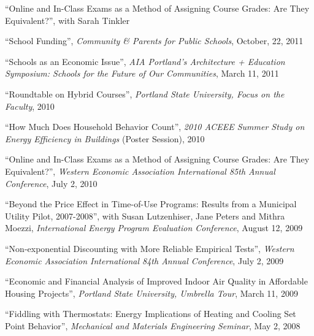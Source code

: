 \documentclass[Computer Science]{vita}
\begin{document}
\begin{vita}
\begin{Publications}
\begin{Work in progress}
\item ``Online and In-Class Exams as a Method of Assigning Course Grades: Are They Equivalent?'', with Sarah Tinkler



    \end{Work in progress}

  \end{Publications}

  \begin{Presentations and Invited Talks}
  \item ``School Funding'', \emph{Community \& Parents for Public Schools}, October, 22, 2011
  
\item ``Schools as an Economic Issue'', \emph{AIA Portland's Architecture + Education Symposium: Schools for the Future of Our Communities}, March 11, 2011

\item ``Roundtable on Hybrid Courses'', \emph{Portland State University, Focus on the Faculty}, 2010

  \item ``How Much Does Household Behavior Count'', \emph{2010 ACEEE
      Summer Study on Energy Efficiency in Buildings} (Poster
    Session), 2010
	  
  \item ``Online and In-Class Exams as a Method of Assigning Course
    Grades: Are They Equivalent?'', \emph{Western Economic Association
      International 85th Annual Conference}, July 2, 2010

  \item ``Beyond the Price Effect in Time-of-Use Programs: Results
    from a Municipal Utility Pilot, 2007-2008'', with Susan
    Lutzenhiser, Jane Peters and Mithra Moezzi, \emph{International
      Energy Program Evaluation Conference}, August 12, 2009

  \item ``Non-exponential Discounting with More Reliable Empirical
    Tests'', \emph{Western Economic Association International 84th
      Annual Conference}, July 2, 2009

  \item ``Economic and Financial Analysis of Improved Indoor Air
    Quality in Affordable Housing Projects'', \emph{Portland State
      University, Umbrella Tour}, March 11, 2009

  \item ``Fiddling with Thermostats: Energy Implications of Heating
    and Cooling Set Point Behavior'', \emph{Mechanical and Materials
      Engineering Seminar}, May 2, 2008


\end{Presentations and Invited Talks}
\end{vita}
\end{document}
